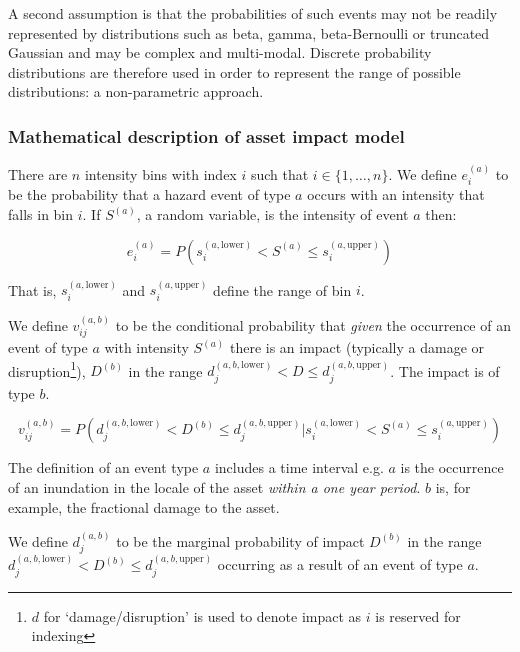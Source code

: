 \documentclass{article}
\begin{document}
A second assumption is that the probabilities of such events may not be readily represented by distributions such as beta, gamma, beta-Bernoulli or truncated Gaussian and may be complex and multi-modal. Discrete probability distributions are therefore used in order to represent the range of possible distributions: a non-parametric approach.

\subsubsection{Mathematical description of asset impact model}
\label{Sec:MathematicalDescriptionOfAssetImpactModel}

There are $n$ intensity bins with index $i$ such that $i \in \{1, \dots, n \}$. We define $e^{(a)}_i$ to be the probability that a hazard event of type $a$ occurs with an intensity that falls in bin $i$. If $S^{(a)}$, a random variable, is the intensity of event $a$ then:

\begin{equation}
    \label{Eq:event}
    e^{(a)}_i = P \left( s^{(a, \text{lower})}_i < S^{(a)} \le s^{(a, \text{upper})}_i \right)
\end{equation}

That is, $s^{(a, \text{lower})}_i$ and $s^{(a, \text{upper})}_i$ define the range of bin $i$.

We define $v^{(a, b)}_{ij}$ to be the conditional probability that \emph{given} the occurrence of an event of type $a$ with intensity $S^{(a)}$ there is an impact (typically a damage or disruption\footnote{$d$ for `damage/disruption' is used to denote impact as $i$ is reserved for indexing}), $D^{(b)}$ in the range $d^{(a,b,\text{lower})}_j < D \le d^{(a,b,\text{upper})}_j$. The impact is of type $b$.


\begin{equation}
    \label{Eq:vulnerability}
    v^{(a, b)}_{ij} = P \left( d^{(a,b,\text{lower})}_j < D^{(b)} \le d^{(a,b,\text{upper})}_j | s^{(a, \text{lower})}_i < S^{(a)} \le s^{(a, \text{upper})}_i \right)
\end{equation}

The definition of an event type $a$ includes a time interval e.g. $a$ is the occurrence of an inundation in the locale of the asset {\it within a one year period}. $b$ is, for example, the fractional damage to the asset.

We define $d^{(a,b)}_j$ to be the marginal probability of impact $D^{(b)}$ in the range $d^{(a,b, \text{lower})}_j < D^{(b)} \le d^{(a,b,\text{upper})}_j$ occurring as a result of an event of type $a$.
\end{document}

